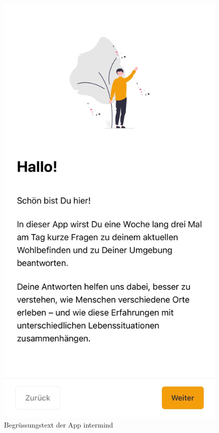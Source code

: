 \begin{figure}[h]
\begin{minipage}[t]{0.38\textwidth}
        \label{fig:startscreen}
    \end{minipage}
    \hspace{0.1\textwidth}
    \begin{minipage}[t]{0.38\textwidth}
        \centering
        \includegraphics[width=\textwidth]{Arbeit/images/printscreens/welcome.jpeg}
        \caption{Begrüssungstext der App \gls{intermind}}
        \label{fig:welcome}
    \end{minipage}
\end{figure}


